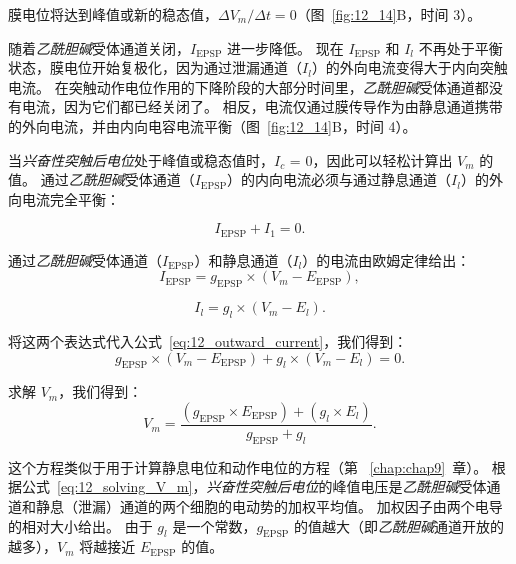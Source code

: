 膜电位将达到峰值或新的稳态值，$\Delta V_m / \Delta t = 0 $（图~\ref{fig:12_14}B，时间 3）。


随着\textit{乙酰胆碱}受体通道关闭，$I_{\text{EPSP}}$ 进一步降低。
现在 $I_{\text{EPSP}}$ 和 $ I_l $ 不再处于平衡状态，膜电位开始复极化，因为通过泄漏通道（$ I_l $）的外向电流变得大于内向突触电流。
在突触动作电位作用的下降阶段的大部分时间里，\textit{乙酰胆碱}受体通道都没有电流，因为它们都已经关闭了。
相反，电流仅通过膜传导作为由静息通道携带的外向电流，并由内向电容电流平衡（图~\ref{fig:12_14}B，时间 4）。


当\textit{兴奋性突触后电位}处于峰值或稳态值时，$ I_c $ = 0，因此可以轻松计算出 $V_m$ 的值。
通过\textit{乙酰胆碱}受体通道（$I_{\text{EPSP}}$）的内向电流必须与通过静息通道（$ I_l $）的外向电流完全平衡：


\begin{equation}\label{eq:12_outward_current}
	I_{\text{EPSP}} + I_1 = 0.
\end{equation}


通过\textit{乙酰胆碱}受体通道（$I_{\text{EPSP}}$）和静息通道（$ I_l $）的电流由欧姆定律给出：
\begin{equation}\label{eq:12_current_EPSP}
	I_{\text{EPSP}} = g_{\text{EPSP}} \times (V_m - E_{\text{EPSP}}),
\end{equation}

\begin{equation}\label{eq:12_current_resting}
	I_l = g_l \times (V_m - E_l).
\end{equation}

将这两个表达式代入公式~\ref{eq:12_outward_current}，我们得到：
\begin{equation}\label{eq:12_outward_current_substituting}
	g_{\text{EPSP}} \times (V_m - E_{\text{EPSP}}) + 
	g_l \times (V_m - E_l) = 0.
\end{equation}

求解 $V_m$，我们得到：
\begin{equation}\label{eq:12_solving_V_m}
	V_m = 
	\frac{
		(g_{\text{EPSP}} \times E_{\text{EPSP}}) + 
		(g_l \times E_l)
	}{
		g_{\text{EPSP}} + g_l
	}.
\end{equation}

这个方程类似于用于计算静息电位和动作电位的方程（第 ~\ref{chap:chap9}~章）。
根据公式~\ref{eq:12_solving_V_m}，\textit{兴奋性突触后电位}的峰值电压是\textit{乙酰胆碱}受体通道和静息（泄漏）通道的两个细胞的电动势的加权平均值。
加权因子由两个电导的相对大小给出。
由于 $ g_l $ 是一个常数，$ g_{\text{EPSP}} $ 的值越大（即\textit{乙酰胆碱}通道开放的越多），$V_m$ 将越接近 $E_{\text{EPSP}}$ 的值。



